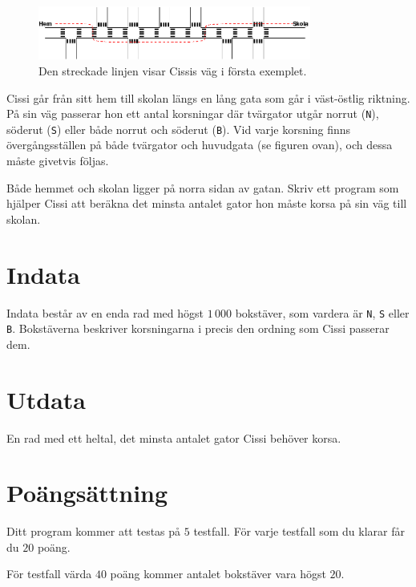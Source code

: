 
\begin{figure}[!h]
\begin{center}
\includegraphics[width=0.8\textwidth]{skolvag.png}
\end{center}
\caption{Den streckade linjen visar Cissis väg i första exemplet.}
\end{figure}

\noindent
Cissi går från sitt hem till skolan längs en lång gata som går i väst-östlig riktning.
På sin väg passerar hon ett antal korsningar där tvärgator utgår norrut (\texttt{N}), söderut (\texttt{S}) eller både norrut och söderut (\texttt{B}).
Vid varje korsning finns övergångsställen på både tvärgator och huvudgata (se figuren ovan), och dessa måste givetvis följas.

Både hemmet och skolan ligger på norra sidan av gatan.
Skriv ett program som hjälper Cissi att beräkna det minsta antalet gator hon måste korsa på sin väg till skolan. 

\section*{Indata}
Indata består av en enda rad med högst $1\,000$ bokstäver, som vardera är {\tt N}, {\tt S} eller {\tt B}.
Bokstäverna beskriver korsningarna i precis den ordning som Cissi passerar dem.

\section*{Utdata}
En rad med ett heltal, det minsta antalet gator Cissi behöver korsa.

\section*{Poängsättning}
Ditt program kommer att testas på $5$ testfall.
För varje testfall som du klarar får du $20$ poäng.

För testfall värda $40$ poäng kommer antalet bokstäver vara högst $20$.
